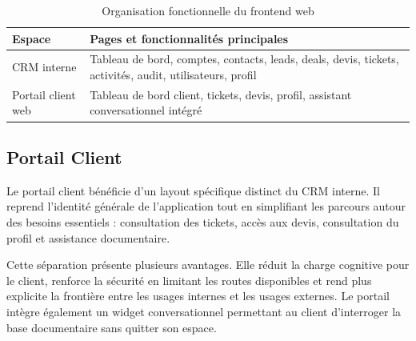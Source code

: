 \begin{table}[H]
\centering
\caption{Organisation fonctionnelle du frontend web}
\label{tab:web_pages}
\begin{tabularx}{\textwidth}{|l|X|}
\hline
\textbf{Espace} & \textbf{Pages et fonctionnalités principales} \\
\hline
CRM interne & Tableau de bord, comptes, contacts, leads, deals, devis, tickets, activités, audit, utilisateurs, profil \\
\hline
Portail client web & Tableau de bord client, tickets, devis, profil, assistant conversationnel intégré \\
\hline
\end{tabularx}
\end{table}





\subsection{Portail Client}
Le portail client bénéficie d'un layout spécifique distinct du CRM interne. Il reprend l'identité générale de l'application tout en simplifiant les parcours autour des besoins essentiels : consultation des tickets, accès aux devis, consultation du profil et assistance documentaire.\par
\vspace{0.3cm}

Cette séparation présente plusieurs avantages. Elle réduit la charge cognitive pour le client, renforce la sécurité en limitant les routes disponibles et rend plus explicite la frontière entre les usages internes et les usages externes. Le portail intègre également un widget conversationnel permettant au client d'interroger la base documentaire sans quitter son espace.

